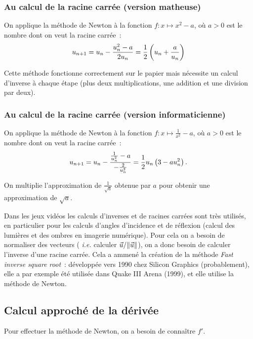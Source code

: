 \subsubsection{Au calcul de la racine carrée (version matheuse)}

On applique la méthode de Newton à la fonction
$f:x\mapsto x^{2} -a$, où $a>0$ est le nombre dont on veut la racine
carrée~:
\begin{equation*}
  u_{n+1} = u_{n} - \frac{u_{n}^{2}-a}{2u_{n}}
  = \frac{1}{2}\left(u_{n}+\frac{a}{u_{n}}\right)
\end{equation*}

Cette méthode fonctionne correctement sur le papier mais nécessite un calcul d'inverse à chaque étape
(plus deux multiplications, une addition et une division par deux).
\subsubsection{Au calcul de la racine carrée (version
  informaticienne)}
On applique la méthode de Newton à la fonction
$f:x\mapsto \frac{1}{x^{2}} -a$, où $a>0$ est le nombre dont on veut
la racine carrée~:
\begin{equation*}
  u_{n+1} = u_{n} - \frac{\frac{1}{u_{n}^{2}}-a}{-\frac{2}{u_{n}^{3}}}
  = \frac{1}{2}u_{n}\left(3 - au_{n}^{2}\right).
\end{equation*}

On multiplie l'approximation de $\frac{1}{\sqrt{a}}$ obtenue par $a$
pour obtenir une approximation de $\sqrt{a}$.

Dans les jeux vidéos les calculs d'inverses et de racines carrées sont très utilisés, en particulier pour les calculs 
d'angles d'incidence et de réflexion (calcul des
  lumières et des ombres en imagerie numérique). Pour cela on a besoin de normaliser des vecteurs ( \emph{i.e.} 
calculer $\vec{u}/{\left\Vert {\vec{u}}\right\Vert}$), on a donc besoin de calculer l'inverse d'une racine carrée. Cela a ammené la création de la
méthode \emph{Fast inverse square root}~: développée vers 1990 chez Silicon Graphics (probablement), elle a par exemple 
été utilisée dans Quake III Arena (1999), et elle utilise la méthode de Newton.

\subsection{Calcul approché de la dérivée}

Pour effectuer la méthode de Newton, on a besoin de connaître $f'$.

